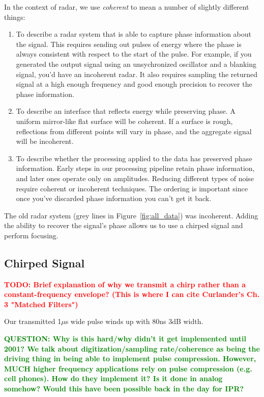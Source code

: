 \documentclass[11pt]{article}
\newcommand{\todo}[1]{\ifthenelse{\boolean{include-todos}} {\textcolor{Red}{\textbf{TODO: #1}}}{}}
\newcommand{\question}[1]{\ifthenelse{\boolean{include-questions}} {\textcolor{Green}{\textbf{QUESTION: #1}}}{}}
\newcommand{\figref}[1]{Figure~\ref{#1}}
\begin{document}
In the context of radar, we use \emph{coherent} to mean a number of slightly different things:
\begin{enumerate}
\item To describe a radar system that is able to capture phase information about the signal. This requires sending out pulses of energy where the phase is always consistent with respect to the start of the pulse. For example, if you generated the output signal using an unsychronized oscillator and a blanking signal, you'd have an incoherent radar. It also requires sampling the returned signal at a high enough frequency and good enough precision to recover the phase information. 
\item To describe an interface that reflects energy while preserving phase. A uniform mirror-like flat surface will be coherent. If a surface is rough, reflections from different points will vary in phase, and the aggregate signal will be incoherent. 
\item To describe whether the processing applied to the data has preserved phase information. Early steps in our processing pipeline retain phase information, and later ones operate only on amplitudes. Reducing different types of noise require coherent or incoherent techniques. The ordering is important since once you've discarded phase information you can't get it back.
\end{enumerate}
    
The old radar system (grey lines in \figref{fig:all_data}) was incoherent. Adding the ability to recover the signal's phase allows us to use a chirped signal and perform focusing. 

\subsection{Chirped Signal}

\todo{Brief explanation of why we transmit a chirp rather than a constant-frequency envelope? (This is where I can cite Curlander's Ch. 3 "Matched Filters")}

Our transmitted 1$\mu$s wide pulse winds up with 80ns 3dB width\cite{Peters2007}.

\question{Why is this hard/why didn't it get implemented until 2001? We talk about digitization/sampling rate/coherence as being the driving thing in being able to implement pulse compression. However, MUCH higher frequency applications rely on pulse compression (e.g. cell phones). How do they implement it? Is it done in analog somehow? Would this have been possible back in the day for IPR?}
\end{document}
